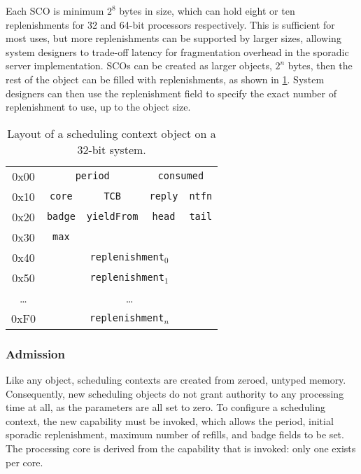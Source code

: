 Each \gls{SCO} is minimum $2^{8}$ bytes in size, which can hold eight or ten replenishments for 32
and 64-bit processors respectively. This is sufficient for most uses, but more replenishments can
be supported by larger sizes, allowing system designers to trade-off latency for fragmentation
overhead in the sporadic server implementation. \glspl{SCO} can be created as larger
objects, $2^{n}$ bytes, then the rest of the object can be filled with replenishments, as
shown in \cref{t:impl-sc-layout}. System designers can then use the  replenishment field
to specify the exact number of replenishment to use, up to the object size. 

\begin{table}[t] 
    \centering
    \begin{tabular}{c|c|c|c|c|}\cline{2-5}
        0x00 &  \multicolumn{2}{c}{\texttt{period}} & \multicolumn{2}{|c|}{\texttt{consumed}}
        \\\cline{2-5}
        0x10 & \texttt{core}                         & \texttt{TCB} & \texttt{reply} & \texttt{ntfn} \\\cline{2-5}
        0x20 &\texttt{badge}                        & \texttt{yieldFrom}                               & \texttt{head}  & \texttt{tail} \\\cline{2-5}
        0x30 & \texttt{max}                          &                                                  &                & \\\cline{2-5}
        0x40 & \multicolumn{4}{c|}{\texttt{replenishment$_{0}$}}  \\\cline{2-5}
        0x50 & \multicolumn{4}{c|}{\texttt{replenishment$_{1}$}}  \\\cline{2-5}
        \ldots & \multicolumn{4}{c|}{\ldots}  \\\cline{2-5}
        0xF0 & \multicolumn{4}{c|}{\texttt{replenishment$_{n}$}}  \\\cline{2-5}


    \end{tabular}
    \caption[Layout of a scheduling context object.]{Layout of a scheduling context object on a 32-bit system.}
    \label{t:impl-sc-layout}
\end{table}

\subsubsection{Admission}

Like any \selfour object, scheduling contexts are created from zeroed, untyped memory. Consequently,
new scheduling objects do not grant authority to any processing time at all, as the parameters are
all set to zero. To configure a scheduling context, the new \schedcontrol capability must be
invoked, which allows the period, initial sporadic replenishment, maximum number of refills, and
badge fields to be set. The processing core is derived from the \schedcontrol capability
that is invoked: only one exists per core. 

